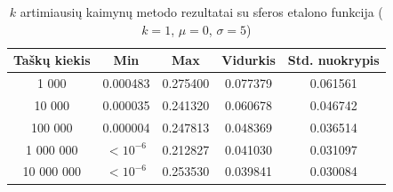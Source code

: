 \begin{table}[H]
    \centering
    \begin{tabular}{|c|c|c|c|c|}
        \hline
        \textbf{Taškų kiekis} & \textbf{Min} & \textbf{Max} & \textbf{Vidurkis} & \textbf{Std. nuokrypis} \\ \hline
        1 000        & 0.000483 & 0.275400 & 0.077379 & 0.061561 \\ \hline
        10 000       & 0.000035 & 0.241320 & 0.060678 & 0.046742 \\ \hline
        100 000      & 0.000004 & 0.247813 & 0.048369 & 0.036514 \\ \hline
        1 000 000    & $<10^{-6}$ & 0.212827 & 0.041030 & 0.031097 \\ \hline
        10 000 000   & $<10^{-6}$ & 0.253530 & 0.039841 & 0.030084 \\ \hline
    \end{tabular}
    \caption{$k$ artimiausių kaimynų metodo rezultatai su sferos etalono funkcija ($k = 1$, $\mu = 0$, $\sigma = 5$)}
\end{table}